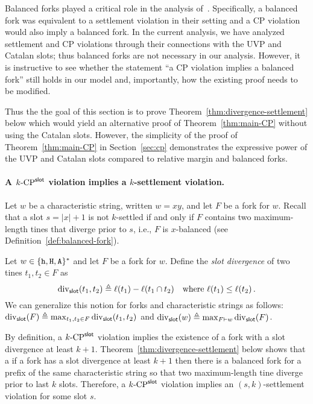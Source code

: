 Balanced forks played a critical role 
in the analysis of~\cite{LinearConsistency}. 
Specifically, a balanced fork was equivalent to a settlement violation in their setting 
and a CP violation would also imply a balanced fork.
In the current analysis, 
we have analyzed settlement and CP violations through 
their connections with the UVP and Catalan slots; 
thus balanced forks are not necessary in our analysis. 
However, it is instructive to see 
whether the statement ``a CP violation implies a balanced fork'' 
still holds in our model 
and, importantly, 
how the existing proof needs to be modified. 

Thus the the goal of this section is to prove 
Theorem~\ref{thm:divergence-settlement} below which 
would yield an alternative proof of Theorem~\ref{thm:main-CP} 
without using the Catalan slots.
However, the simplicity of the proof of Theorem~\ref{thm:main-CP} 
in Section~\ref{sec:cp} 
demonstrates the expressive power of the UVP and Catalan slots 
compared to relative margin and balanced forks.



\paragraph{A ${k}\text{-}\mathrm{CP}^{\mathsf{slot}}$ violation implies a $k$-settlement violation.}
Let $w$ be a characteristic string, written $w = xy$, 
and let $F$ be a fork for $w$. 
Recall that a slot $s = |x| + 1$ is not $k$-settled 
if and only if $F$ contains 
two maximum-length tines that diverge prior to $s$, 
i.e., $F$ is $x$-balanced (see Definition~\ref{def:balanced-fork}).


\begin{definition}\label{def:slot-divergence}
  Let $w \in \{\mathtt{h}, \mathtt{H}, \mathtt{A}\}^*$ and let $F$ be a fork for $w$. 
  Define the \emph{slot divergence} of 
  two tines $t_1, t_2 \in F$ 
  as 
  \begin{equation}\label{eq:slot-divergence-tines}
    \mathrm{div}_{\mathsf{slot}}(t_1, t_2) \triangleq \ell(t_1) - \ell(t_1 \cap t_2)
    \quad\text{where $\ell(t_1) \leq \ell(t_2)$}
    \,.
  \end{equation}
  We can generalize this notion for forks and characteristic strings as follows: 
  $\mathrm{div}_{\mathsf{slot}}(F) \triangleq \max_{t_1, t_2 \in F} \mathrm{div}_{\mathsf{slot}}(t_1, t_2)$ and 
  $\mathrm{div}_{\mathsf{slot}}(w) \triangleq \max_{F \vdash w} \mathrm{div}_{\mathsf{slot}}(F)$. 
\end{definition}

By definition, a ${k}\text{-}\mathrm{CP}^{\mathsf{slot}}$ violation 
implies the existence of a fork with a slot divergence at least $k + 1$. 
Theorem~\ref{thm:divergence-settlement} below 
shows that a if a fork has a slot divergence at least $k+1$ then 
there is a balanced fork for a prefix of the same characteristic string so that 
two maximum-length tine diverge prior to last $k$ slots. 
Therefore, a ${k}\text{-}\mathrm{CP}^{\mathsf{slot}}$ violation implies an $(s,k)$-settlement violation 
for some slot $s$.



